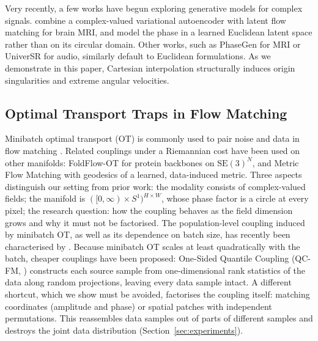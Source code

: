 Very recently, a few works have begun exploring generative models for complex signals. \citet{schlimbach2026complex} combine a complex-valued variational autoencoder with latent flow matching for brain MRI, and model the phase in a learned Euclidean latent space rather than on its circular domain. Other works, such as PhaseGen \citep{rempe2025phasegen} for MRI or UniverSR \citep{choi2025universr} for audio, similarly default to Euclidean formulations. As we demonstrate in this paper, Cartesian interpolation structurally induces origin singularities and extreme angular velocities. 

\subsection{Optimal Transport Traps in Flow Matching}
\label{sec:rel_ot}
Minibatch optimal transport (OT) is commonly used to pair noise and data in flow matching \citep{pooladian2023multisample, tong2023improving}. Related couplings under a Riemannian cost have been used on other manifolds: FoldFlow-OT \citep{bose2024foldflow} for protein backbones on $\mathrm{SE}(3)^N$, and Metric Flow Matching \citep{kapusniak2024metric} with geodesics of a learned, data-induced metric. Three aspects distinguish our setting from prior work: the modality consists of complex-valued fields; the manifold is $([0, \infty) \times S^1)^{H \times W}$, whose phase factor is a circle at every pixel; the research question: how the coupling behaves as the field dimension grows and why it must not be factorised. The population-level coupling induced by minibatch OT, as well as its dependence on batch size, has recently been characterised by \citet{boite2026minibatch}. Because minibatch OT scales at least quadratically with the batch, cheaper couplings have been proposed: One-Sided Quantile Coupling (QC-FM, \citealp{kim2026onesided}) constructs each source sample from one-dimensional rank statistics of the data along random projections, leaving every data sample intact. A different shortcut, which we show must be avoided, factorises the coupling itself: matching coordinates (amplitude and phase) or spatial patches with independent permutations. This reassembles data samples out of parts of different samples and destroys the joint data distribution (Section~\ref{sec:experiments}).

